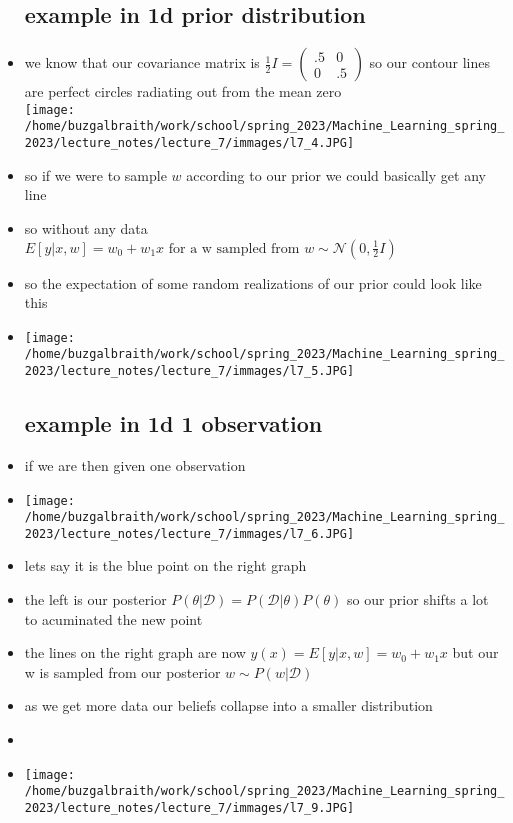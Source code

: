 \documentclass{article}
\begin{document}
\begin{itemize}
\subsection*{example in 1d prior distribution}
\item we know that our covariance matrix is $\frac{1}{2}I=\begin{pmatrix}
    .5&0\\0&.5
\end{pmatrix}$ so our contour lines are perfect circles radiating out from the mean zero\\
\texttt{[image: /home/buzgalbraith/work/school/spring\_2023/Machine\_Learning\_spring\_2023/lecture\_notes/lecture\_7/immages/l7\_4.JPG]}
\item so if we were to sample $w$ according to our prior we could basically get any line
\item so without any data $E[y|x,w]=w_0+w_1x\text{ for a w sampled from } w\sim\mathcal{N}(0,\frac{1}{2}I)$
\item so the expectation of some random realizations of our prior could look like this 
\item \texttt{[image: /home/buzgalbraith/work/school/spring\_2023/Machine\_Learning\_spring\_2023/lecture\_notes/lecture\_7/immages/l7\_5.JPG]}
\subsection*{example in 1d 1 observation}
\item if we are then given one observation \item \texttt{[image: /home/buzgalbraith/work/school/spring\_2023/Machine\_Learning\_spring\_2023/lecture\_notes/lecture\_7/immages/l7\_6.JPG]}
\item lets say it is the blue point on the right graph 
\item the left is our posterior $P(\theta|\mathcal{D})=P(\mathcal{D}|\theta)P(\theta)$ so our prior shifts a lot to acuminated the new point 
\item the lines on the right graph are now $y(x)=E[y|x,w]=w_0+w_1x$ but our w is sampled from our posterior $w\sim P(w|\mathcal{D})$
\item as we get more data our beliefs collapse into a smaller distribution
\item \item \texttt{[image: /home/buzgalbraith/work/school/spring\_2023/Machine\_Learning\_spring\_2023/lecture\_notes/lecture\_7/immages/l7\_9.JPG]}

\end{itemize}
\end{document}
